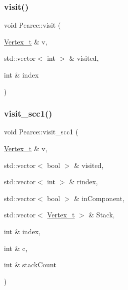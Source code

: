 \subsubsection{\texorpdfstring{visit()}{visit()}}
{\footnotesize\ttfamily void Pearce\+::visit (\begin{DoxyParamCaption}\item[{\hyperlink{class_graph_component_ae67114a6ce5a001dc35e1996e1b45aa0_ae67114a6ce5a001dc35e1996e1b45aa0}{Vertex\+\_\+t} \&}]{v,  }\item[{std\+::vector$<$ int $>$ \&}]{visited,  }\item[{int \&}]{index }\end{DoxyParamCaption})}

\mbox{\label{class_pearce_ae4e9364dd0c829564ecfbfe8ccc07b6a_ae4e9364dd0c829564ecfbfe8ccc07b6a}} 
\subsubsection{\texorpdfstring{visit\+\_\+scc1()}{visit\_scc1()}}
{\footnotesize\ttfamily void Pearce\+::visit\+\_\+scc1 (\begin{DoxyParamCaption}\item[{\hyperlink{class_graph_component_ae67114a6ce5a001dc35e1996e1b45aa0_ae67114a6ce5a001dc35e1996e1b45aa0}{Vertex\+\_\+t} \&}]{v,  }\item[{std\+::vector$<$ bool $>$ \&}]{visited,  }\item[{std\+::vector$<$ int $>$ \&}]{rindex,  }\item[{std\+::vector$<$ bool $>$ \&}]{in\+Component,  }\item[{std\+::vector$<$ \hyperlink{class_graph_component_ae67114a6ce5a001dc35e1996e1b45aa0_ae67114a6ce5a001dc35e1996e1b45aa0}{Vertex\+\_\+t} $>$ \&}]{Stack,  }\item[{int \&}]{index,  }\item[{int \&}]{c,  }\item[{int \&}]{stack\+Count }\end{DoxyParamCaption})}

\mbox{\label{class_pearce_a12c836f8f0dbd85e20c0f3f4f0c5fb47_a12c836f8f0dbd85e20c0f3f4f0c5fb47}} 
